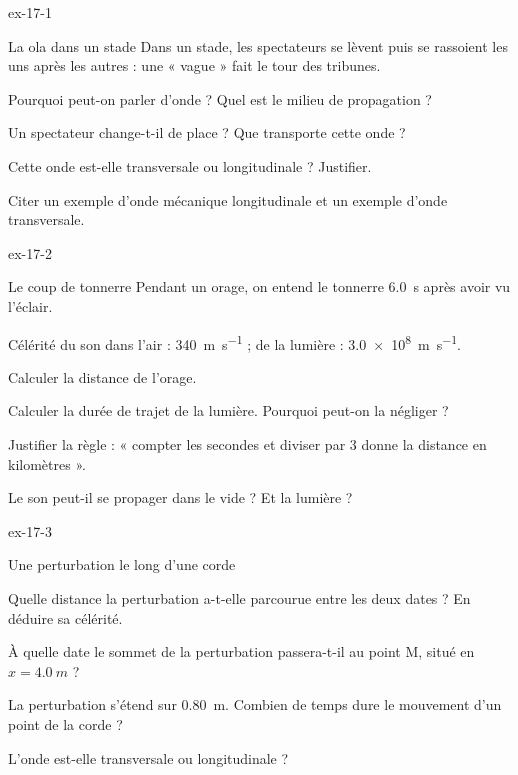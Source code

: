 \begin{blocLivre}{ex-17-1}
\begin{exercice}[1]{La ola dans un stade}
Dans un stade, les spectateurs se lèvent puis se rassoient les uns après les autres : une « vague » fait le tour des tribunes.
\begin{questions}
\item Pourquoi peut-on parler d'onde ? Quel est le milieu de propagation ?
\item Un spectateur change-t-il de place ? Que transporte cette onde ?
\item Cette onde est-elle transversale ou longitudinale ? Justifier.
\item Citer un exemple d'onde mécanique longitudinale et un exemple d'onde transversale.
\end{questions}
\end{exercice}
\end{blocLivre}
\begin{blocLivre}{ex-17-2}
\begin{exercice}[1]{Le coup de tonnerre}
Pendant un orage, on entend le tonnerre \qty{6,0}{s} après avoir vu l'éclair.
\begin{donnees}
Célérité du son dans l'air : \qty{340}{m.s^{-1}} ; de la lumière : \qty{3,0e8}{m.s^{-1}}.
\end{donnees}
\begin{questions}
\item Calculer la distance de l'orage.
\item Calculer la durée de trajet de la lumière. Pourquoi peut-on la négliger ?
\item Justifier la règle : « compter les secondes et diviser par 3 donne la distance en kilomètres ».
\item Le son peut-il se propager dans le vide ? Et la lumière ?
\end{questions}
\end{exercice}
\end{blocLivre}
\begin{blocLivre}{ex-17-3}
\begin{exercice}[1]{Une perturbation le long d'une corde}
\begin{questions}
\item Quelle distance la perturbation a-t-elle parcourue entre les deux dates ? En déduire sa célérité.
\item À quelle date le sommet de la perturbation passera-t-il au point M, situé en $x=\qty{4,0}{m}$ ?
\item La perturbation s'étend sur \qty{0,80}{m}. Combien de temps dure le mouvement d'un point de la corde ?
\item L'onde est-elle transversale ou longitudinale ?
\end{questions}
\end{exercice}
\end{blocLivre}
